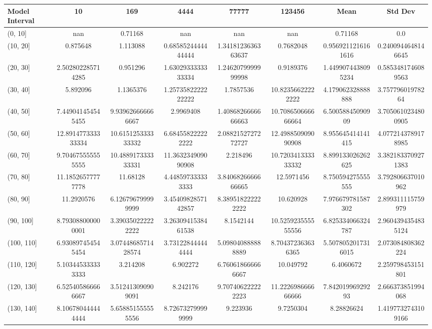 \begin{table}[H]
\centering
\begin{tabular}{|l |c |c |c |c |c |c |c|}
\hline
Model Interval & 10 & 169 & 4444 & 77777 & 123456 & Mean & Std Dev \\
\hline
(0, 10] & nan & 0.71168 & nan & nan & nan & 0.71168 & 0.0 \\
(10, 20] & 0.875648 & 1.113088 & 0.6858524444444444 & 1.3418123636363637 & 0.7682048 & 0.9569211216161616 & 0.2400944648146645 \\
(20, 30] & 2.502802285714285 & 0.951296 & 1.6302933333333334 & 1.2462079999999998 & 0.9189376 & 1.4499074438095234 & 0.5853481746089563 \\
(30, 40] & 5.892096 & 1.1365376 & 1.2573582222222222 & 1.7857536 & 10.82356622222222 & 4.179062328888888 & 3.75779601978264 \\
(40, 50] & 7.449041454545455 & 9.939626666666667 & 2.9969408 & 1.4086826666666663 & 10.708650666666664 & 6.50058845090909 & 3.7050610234800905 \\
(50, 60] & 12.891477333333334 & 10.615125333333332 & 6.684558222222222 & 2.0882152727272727 & 12.498850909090908 & 8.955645414141415 & 4.0772143789178985 \\
(60, 70] & 9.704675555555555 & 10.488917333333331 & 11.363234909090908 & 2.218496 & 10.720341333333332 & 8.899133026262625 & 3.3821833709271383 \\
(70, 80] & 11.18526577777778 & 11.68128 & 4.448597333333333 & 3.8406826666666665 & 12.5971456 & 8.750594275555555 & 3.792806637010962 \\
(80, 90] & 11.2920576 & 6.126796799999999 & 3.4540982857142857 & 8.389518222222222 & 10.620928 & 7.976679781587302 & 2.899311115759979 \\
(90, 100] & 8.793088000000001 & 3.390350222222222 & 3.2630941538461538 & 8.1542144 & 10.525923555555556 & 6.825334066324787 & 2.9604394354835124 \\
(100, 110] & 6.930897454545454 & 3.0744868571428574 & 3.731228444444444 & 5.098040888888889 & 8.704372363636365 & 5.5078052017316015 & 2.073084808362224 \\
(110, 120] & 5.103445333333333 & 3.214208 & 6.902272 & 6.760618666666667 & 10.049792 & 6.4060672 & 2.259798453151801 \\
(120, 130] & 6.525405866666667 & 3.512413090909091 & 8.242176 & 9.707406222222223 & 11.222698666666666 & 7.84201996929293 & 2.666373851994068 \\
(130, 140] & 8.106780444444444 & 5.658851555555556 & 8.726732799999999 & 9.223936 & 9.7250304 & 8.28826624 & 1.4197732743109166 \\

\end{tabular}
\end{table}
